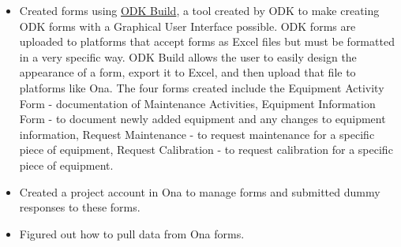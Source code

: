 \documentclass[]{article}
\providecommand{\tightlist}{%
  \setlength{\itemsep}{0pt}\setlength{\parskip}{0pt}}
\begin{document}
\begin{itemize}
  \begin{itemize}
  \tightlist
  \item
    Created forms using
    \href{https://docs.opendatakit.org/build-intro/}{ODK Build}, a tool
    created by ODK to make creating ODK forms with a Graphical User
    Interface possible. ODK forms are uploaded to platforms that accept
    forms as Excel files but must be formatted in a very specific way.
    ODK Build allows the user to easily design the appearance of a form,
    export it to Excel, and then upload that file to platforms like Ona.
    The four forms created include the Equipment Activity Form -
    documentation of Maintenance Activities, Equipment Information Form
    - to document newly added equipment and any changes to equipment
    information, Request Maintenance - to request maintenance for a
    specific piece of equipment, Request Calibration - to request
    calibration for a specific piece of equipment.
  \item
    Created a project account in Ona to manage forms and submitted dummy
    responses to these forms.
  \item
    Figured out how to pull data from Ona forms.
  \end{itemize}
\end{itemize}
\end{document}

